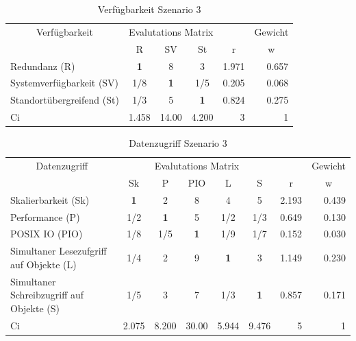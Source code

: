 \begin{table}[htbp]
\caption{Verfügbarkeit Szenario 3}
\begin{tabular}{|p{7.1cm}|c|c|c|r|r|}
\hline
\multicolumn{ 1}{|c|}{Verfügbarkeit} & \multicolumn{ 3}{c|}{Evalutations Matrix} & \multicolumn{1}{l|}{} & \multicolumn{1}{l|}{Gewicht} \\ \cline{ 2- 6}
\multicolumn{ 1}{|c|}{} & R & SV & St & \multicolumn{1}{c|}{r} & \multicolumn{1}{c|}{w} \\ \hline
Redundanz (R) & \textbf{1    } & 8     & 3     & 1.971 & 0.657 \\ \hline
Systemverfügbarkeit (SV) &  1/8 & \textbf{1} &  1/5 & 0.205 & 0.068 \\ \hline
Standortübergreifend (St) &  1/3 & 5     & \textbf{1} & 0.824 & 0.275 \\ \hline \hline
Ci & \multicolumn{1}{r|}{1.458} & \multicolumn{1}{r|}{14.00} & \multicolumn{1}{r|}{4.200} & 3 & 1 \\ \hline
\end{tabular}
\label{AHPVerfügbarkeitS 3}
\end{table}


\begin{table}[htbp]
\caption{Datenzugriff Szenario 3}
\begin{tabular}{|p{4.5cm}|c|c|c|c|c|r|r|}
\hline
\multicolumn{ 1}{|c|}{Datenzugriff} & \multicolumn{ 5}{c|}{Evalutations Matrix} & \multicolumn{1}{l|}{} & \multicolumn{1}{l|}{Gewicht} \\ \cline{ 2- 8}
\multicolumn{ 1}{|c|}{} & Sk & P & PIO  & L & S & \multicolumn{1}{c|}{r} & \multicolumn{1}{c|}{w} \\ \hline
Skalierbarkeit (Sk) & \textbf{1} & 2 & 8 & 4 & 5 & 2.193 & 0.439 \\ \hline
Performance (P) &  1/2 & \textbf{1} & 5 &  1/2 &  1/3 & 0.649 & 0.130 \\ \hline
POSIX IO (PIO) &  1/8 &  1/5 & \textbf{1} &  1/9 &  1/7 & 0.152 & 0.030 \\ \hline
Simultaner Lesezufgriff 
auf Objekte (L) &  1/4 & 2 & 9 & \textbf{1} & 3 & 1.149 & 0.230 \\ \hline
Simultaner Schreibzugriff
 auf Objekte (S) &  1/5 & 3 & 7 &  1/3 & \textbf{1} & 0.857 & 0.171 \\ \hline \hline
Ci & \multicolumn{1}{r|}{2.075} & \multicolumn{1}{r|}{8.200} & \multicolumn{1}{r|}{30.00} & \multicolumn{1}{r|}{5.944} & \multicolumn{1}{r|}{9.476} & 5 & 1 \\ \hline
\end{tabular}
\label{AHPDatenzugriffS 3}
\end{table}

